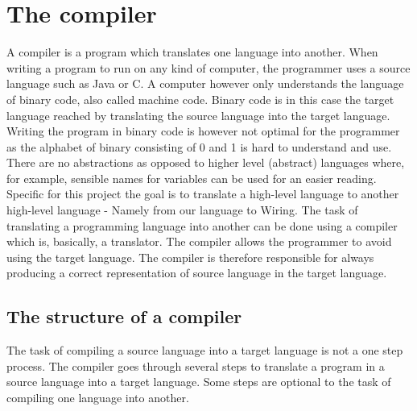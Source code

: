 \chapter{The compiler}
A compiler is a program which translates one language into another. When writing a program to run on any kind of computer, the programmer uses a source language such as Java or C. A computer however only understands the language of binary code, also called machine code. Binary code is in this case the target language reached by translating the source language into the target language. Writing the program in binary code is however not optimal for the programmer as the alphabet of binary consisting of 0 and 1 is hard to understand and use. There are no abstractions as opposed to higher level (abstract) languages where, for example, sensible names for variables can be used for an easier reading.\\
Specific for this project the goal is to translate a high-level language to another high-level language - Namely from our language to Wiring. The task of translating a programming language into another can be done using a compiler which is, basically, a translator. The compiler allows the programmer to avoid using the target language. The compiler is therefore responsible for always producing a correct representation of source language in the target language.

\section{The structure of a compiler}
The task of compiling a source language into a target language is not a one step process. The compiler goes through several steps to translate a program in a source language into a target language. Some steps are optional to the task of compiling one language into another.\cite{compiler:structure}\\

